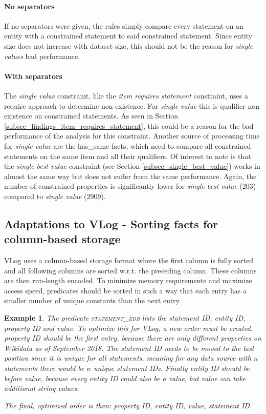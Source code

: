 \documentclass[hyperref,bachelorofscience,fleqn]{cgvpub}
\newtheorem{example}{Example}
\begin{document}
\paragraph{No separators}
If no separators were given, the rules simply compare every statement on an entity with a constrained statement to said constrained statement. Since entity size does not increase with dataset size, this should not be the reason for \emph{single values} bad performance.

\paragraph{With separators}
The \emph{single value} constraint, like the \emph{item requires statement} constraint, uses a require approach to determine non-existence. For \emph{single value} this is qualifier non-existence on constrained statements. As seen in Section \ref{subsec_findings_item_requires_statement}, this could be a reason for the bad performance of the analysis for this constraint. Another source of processing time for \emph{single value} are the has\_same facts, which need to compare all constrained statements on the same item and all their qualifiers. Of interest to note is that the \emph{single best value} constraint (see Section \ref{subsec_single_best_value}) works in almost the same way but does not suffer from the same performance. Again, the number of constrained properties is significantly lower for \emph{single best value} (203) compared to \emph{single value} (2909).

\subsection{Adaptations to VLog - Sorting facts for column-based storage}
VLog uses a column-based storage format where the first column is fully sorted and all following columns are sorted w.r.t. the preceding column. These columns are then run-length encoded. To minimize memory requirements and maximize access speed, predicates should be sorted in such a way that each entry has a smaller number of unique constants than the next entry.

\begin{example}
The predicate \textsc{statement\_edb} lists the \emph{statement ID}, \emph{entity ID}, \emph{property ID} and \emph{value}. To optimize this for VLog, a new order must be created. \emph{property ID} should be the first entry, because there are only  different properties on Wikidata as of September 2018. The \emph{statement ID} needs to be moved to the last position since it is unique for all statements, meaning for any data source with \(n\) statements there would be \(n\) unique \emph{statement IDs}. Finally \emph{entity ID} should be before \emph{value}, because every \emph{entity ID} could also be a \emph{value}, but value can take additional string values.

The final, optimized order is then: \emph{property ID}, \emph{entity ID}, \emph{value}, \emph{statement ID}.
\end{example}
\end{document}
